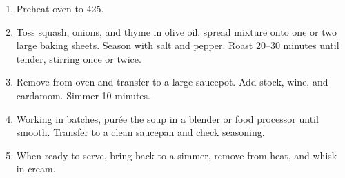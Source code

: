 
\begin{ingredients}
\end{ingredients}


\begin{recipe}
  \begin{enumerate}

  \item Preheat oven to 425\F.

  \item Toss squash, onions, and thyme in olive oil.  spread mixture
    onto one or two large baking sheets.  Season with salt and
    pepper.  Roast 20--30 minutes until tender, stirring once or twice.

  \item Remove from oven and transfer to a large saucepot.  Add stock,
    wine, and cardamom.  Simmer 10 minutes.

  \item Working in batches, pur\'ee the soup in a blender or food
    processor until smooth.  Transfer to a clean saucepan and check
    seasoning.

  \item When ready to serve, bring back to a simmer, remove from heat,
    and whisk in cream.

  \end{enumerate}
\end{recipe}
